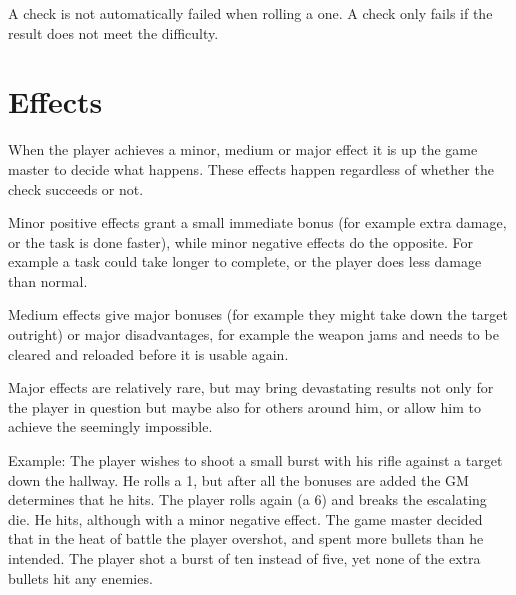 A check is not automatically failed when rolling a one. A check only fails if
the result does not meet the difficulty.

\section{Effects}
\label{sec:3-Effects}

When the player achieves a minor, medium or major effect it is up the game
master to decide what happens. These effects happen regardless of whether the
check succeeds or not.

Minor positive effects grant a small immediate bonus (for example extra
damage, or the task is done faster), while minor negative effects do the
opposite. For example a task could take longer to complete, or the player
does less damage than normal.

Medium effects give major bonuses (for example they might take down the target
outright) or major disadvantages, for example the weapon jams and needs to be
cleared and reloaded before it is usable again.

Major effects are relatively rare, but may bring devastating results not only
for the player in question but maybe also for others around him, or allow him
to achieve the seemingly impossible.

Example: The player wishes to shoot a small burst with his rifle against a
target down the hallway. He rolls a 1, but after all the bonuses are added
the GM determines that he hits. The player rolls again (a 6) and breaks the
escalating die. He hits, although with a minor negative effect. The game
master decided that in the heat of battle the player overshot, and spent
more bullets than he intended. The player shot a burst of ten instead of five,
yet none of the extra bullets hit any enemies.
